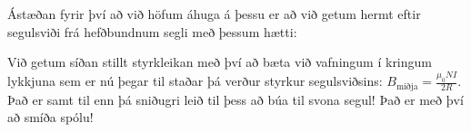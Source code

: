 \ifdefined \wholebook \else\documentclass[oneside]{book}\usepackage{EdlBook}\graphicspath{{figures/}}
\begin{document}
Ástæðan fyrir því að við höfum áhuga á þessu er að við getum hermt eftir segulsviði frá hefðbundnum segli með þessum hætti:

\begin{figure}[H]
\hfill
{}
\hfill
{}
\hfill
\end{figure}
Við getum síðan stillt styrkleikan með því að bæta við vafningum í kringum lykkjuna sem er nú þegar til staðar þá verður styrkur segulsviðsins: $B_{\text{miðja}} = \frac{\mu_0 N I}{2 R}$. Það er samt til enn þá sniðugri leið til þess að búa til svona segul! Það er með því að smíða spólu!
\end{document}

